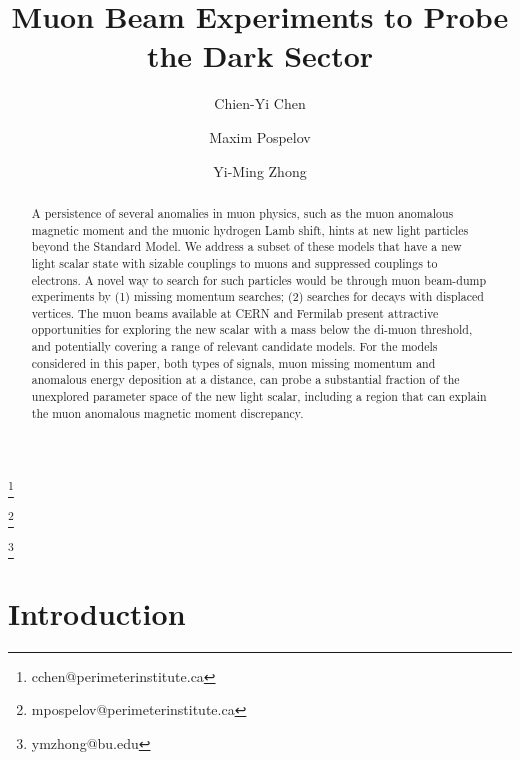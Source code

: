 \documentclass[prd,onecolumn,notitlepage,
nofootinbib,aps,tightenlines,
preprintnumbers,amsmath,amssymb,amsfonts,showpacs,superscriptaddress]{revtex4-1}
\begin{document}
\title{Muon Beam Experiments to Probe the Dark Sector}

\author{Chien-Yi Chen}
\thanks{cchen@perimeterinstitute.ca}

\author{Maxim Pospelov}
\thanks{mpospelov@perimeterinstitute.ca}

\author{Yi-Ming Zhong}
\thanks{ymzhong@bu.edu}


\begin{abstract}
 A persistence of several anomalies in muon physics, such as the muon anomalous magnetic moment and the muonic hydrogen Lamb shift, hints at
new light particles beyond the Standard Model. We address a subset of these models that have a new light scalar state with sizable couplings to muons and suppressed couplings to electrons. 
A novel way to search for such particles would be through muon beam-dump experiments by (1) missing momentum searches; (2) searches for decays with displaced vertices. 
The muon beams available at CERN and Fermilab present
 attractive opportunities for exploring the new scalar with a mass below the di-muon threshold, and potentially 
covering a range of relevant candidate models. For the models considered in this paper, both types of signals, 
muon missing momentum and anomalous energy deposition at a distance, can probe a substantial fraction of the unexplored parameter space of the new light scalar, including a  region that can explain the muon anomalous magnetic moment discrepancy.   
\end{abstract}	
\maketitle

\section{Introduction}
\end{document}
